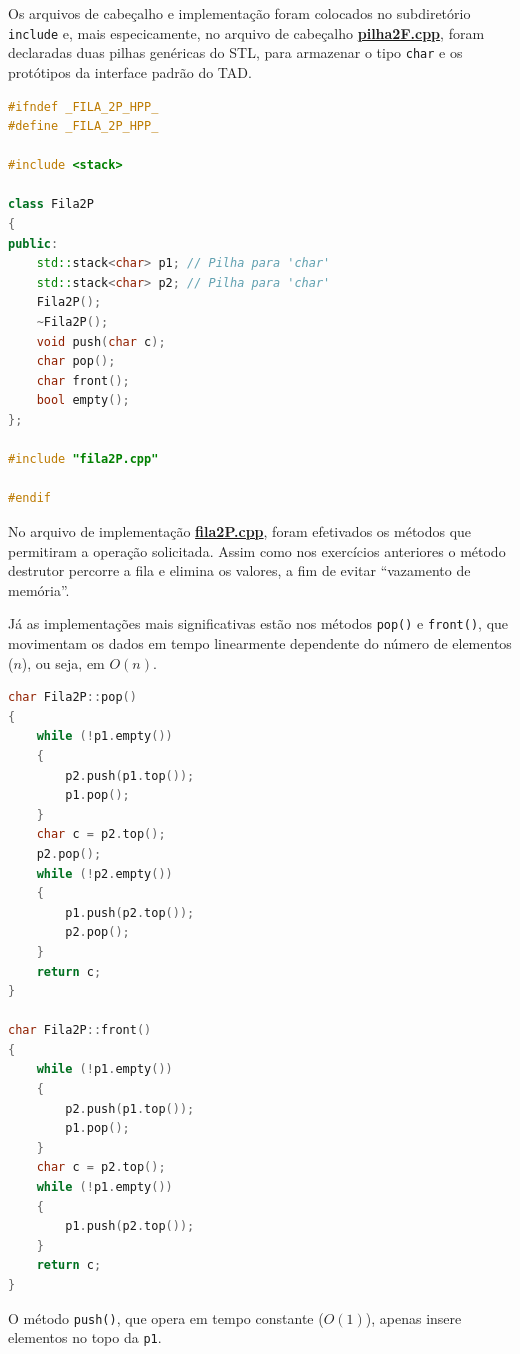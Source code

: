 \documentclass[
  brazilian,
  paper=a4,
  oneside  ,captions=tableheading
]{scrbook}
\newcommand{\passthrough}[1]{#1}
\begin{document}
Os arquivos de cabeçalho e implementação foram colocados no subdiretório
\passthrough{\lstinline!include!} e, mais especicamente, no arquivo de
cabeçalho
\href{https://github.com/ecostadelle/lista_pilhas_filas/blob/main/include/pilha2F.cpp}{\textbf{pilha2F.cpp}},
foram declaradas duas pilhas genéricas do STL, para armazenar o tipo
\passthrough{\lstinline!char!} e os protótipos da interface padrão do
TAD.

\begin{lstlisting}[language={C++}]
#ifndef _FILA_2P_HPP_
#define _FILA_2P_HPP_

#include <stack>

class Fila2P
{
public:
    std::stack<char> p1; // Pilha para 'char'
    std::stack<char> p2; // Pilha para 'char'
    Fila2P();
    ~Fila2P();
    void push(char c);
    char pop();
    char front();
    bool empty();
};

#include "fila2P.cpp"

#endif
\end{lstlisting}

No arquivo de implementação
\href{https://github.com/ecostadelle/lista_pilhas_filas/blob/main/include/fila2P.cpp}{\textbf{fila2P.cpp}},
foram efetivados os métodos que permitiram a operação solicitada. Assim
como nos exercícios anteriores o método destrutor percorre a fila e
elimina os valores, a fim de evitar ``vazamento de memória''.

Já as implementações mais significativas estão nos métodos
\passthrough{\lstinline!pop()!} e \passthrough{\lstinline!front()!}, que
movimentam os dados em tempo linearmente dependente do número de
elementos (\(n\)), ou seja, em \(O(n)\).

\begin{lstlisting}[language={C++}]
char Fila2P::pop()
{
    while (!p1.empty())
    {
        p2.push(p1.top());
        p1.pop();
    }
    char c = p2.top();
    p2.pop();
    while (!p2.empty())
    {
        p1.push(p2.top());
        p2.pop();
    }
    return c;
}

char Fila2P::front()
{
    while (!p1.empty())
    {
        p2.push(p1.top());
        p1.pop();
    }
    char c = p2.top();
    while (!p1.empty())
    {
        p1.push(p2.top());
    }
    return c;
}
\end{lstlisting}

O método \passthrough{\lstinline!push()!}, que opera em tempo constante
(\(O(1)\)), apenas insere elementos no topo da
\passthrough{\lstinline!p1!}.
\end{document}
